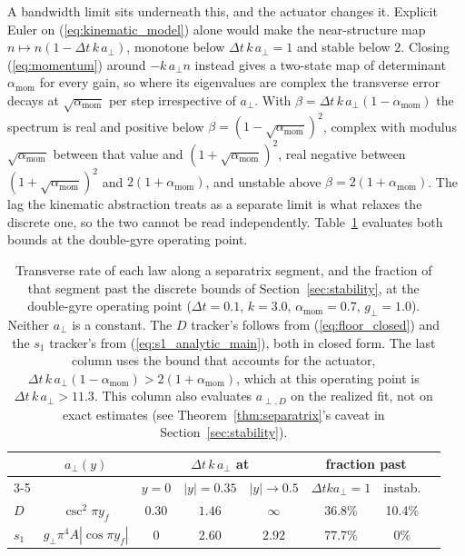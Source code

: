 \documentclass[lettersize,journal]{IEEEtran}
\begin{document}
A bandwidth limit sits underneath this, and the actuator changes it.
Explicit Euler on (\ref{eq:kinematic_model}) alone would make the
near-structure map $n \mapsto n(1 - \Delta t\,k\,a_\perp)$, monotone
below $\Delta t\,k\,a_\perp = 1$ and stable below $2$. Closing
(\ref{eq:momentum}) around $-k\,a_\perp n$ instead gives a two-state map
of determinant $\alpha_{\text{mom}}$ for every gain, so where its
eigenvalues are complex the transverse error decays at
$\sqrt{\alpha_{\text{mom}}}$ per step irrespective of $a_\perp$. With
$\beta = \Delta t\,k\,a_\perp(1 - \alpha_{\text{mom}})$ the spectrum is
real and positive below $\beta = (1 - \sqrt{\alpha_{\text{mom}}})^2$,
complex with modulus $\sqrt{\alpha_{\text{mom}}}$ between that value and
$(1 + \sqrt{\alpha_{\text{mom}}})^2$, real negative between
$(1 + \sqrt{\alpha_{\text{mom}}})^2$ and $2(1 + \alpha_{\text{mom}})$, and
unstable above $\beta = 2(1 + \alpha_{\text{mom}})$. The lag the
kinematic abstraction treats as a separate limit is what relaxes the
discrete one, so the two cannot be read independently. Table~\ref{tab:bandwidth} evaluates both
bounds at the double-gyre operating point.
\begin{table}[!t]
\centering
\caption{Transverse rate of each law along a separatrix segment, and the
fraction of that segment past the discrete bounds of
Section~\ref{sec:stability}, at the double-gyre operating point
($\Delta t = 0.1$, $k = 3.0$,
$\alpha_{\text{mom}} = 0.7$, $g_\perp = 1.0$). Neither $a_\perp$ is a
constant. The $D$ tracker's follows from
(\ref{eq:floor_closed}) and the $s_1$ tracker's from
(\ref{eq:s1_analytic_main}), both in closed form. The last column uses
the bound that accounts for the actuator, $\Delta t\,k\,a_\perp
(1-\alpha_{\text{mom}}) > 2(1+\alpha_{\text{mom}})$, which at
this operating point is $\Delta t\,k\,a_\perp > 11.3$. This column also
evaluates $a_{\perp,D}$ on the realized fit, not on exact estimates
(see Theorem~\ref{thm:separatrix}'s caveat in Section~\ref{sec:stability}).}
\label{tab:bandwidth}
\footnotesize
\setlength{\tabcolsep}{3pt}
\begin{tabular}{@{}lccccccc@{}}
\hline
 & $a_\perp(y)$ & \multicolumn{3}{c}{$\Delta t\,k\,a_\perp$ at}
 & \multicolumn{2}{c}{fraction past} \\
\cline{3-5}\cline{6-7}
 & & $y\!=\!0$ & $|y|\!=\!0.35$ & $|y|\!\to\!0.5$
 & $\Delta t k a_\perp\!=\!1$ & instab. \\
\hline
$D$ & $\csc^2 \pi y_f$ & $0.30$ & $1.46$ & $\infty$ & 36.8\% & 10.4\% \\
$s_1$ & $g_\perp \pi^4 A |\cos \pi y_f|$ & $0$ & $2.60$ & $2.92$ & 77.7\% & 0\% \\
\hline
\end{tabular}
\end{table}
\end{document}
